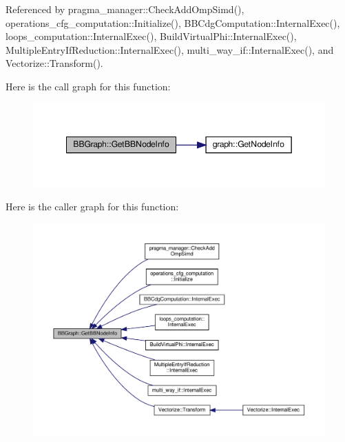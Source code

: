 Referenced by pragma\+\_\+manager\+::\+Check\+Add\+Omp\+Simd(), operations\+\_\+cfg\+\_\+computation\+::\+Initialize(), B\+B\+Cdg\+Computation\+::\+Internal\+Exec(), loops\+\_\+computation\+::\+Internal\+Exec(), Build\+Virtual\+Phi\+::\+Internal\+Exec(), Multiple\+Entry\+If\+Reduction\+::\+Internal\+Exec(), multi\+\_\+way\+\_\+if\+::\+Internal\+Exec(), and Vectorize\+::\+Transform().

Here is the call graph for this function\+:
\nopagebreak
\begin{figure}[H]
\begin{center}
\leavevmode
\includegraphics[width=349pt]{dd/d5f/structBBGraph_aab31f928508260163e2e5cd30083e49f_cgraph}
\end{center}
\end{figure}
Here is the caller graph for this function\+:
\nopagebreak
\begin{figure}[H]
\begin{center}
\leavevmode
\includegraphics[width=350pt]{dd/d5f/structBBGraph_aab31f928508260163e2e5cd30083e49f_icgraph}
\end{center}
\end{figure}
\mbox{\label{structBBGraph_aa2587565b22cca94135ee697daa21922}} 
